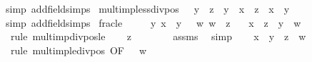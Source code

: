 \begin{isabellebody}
%
\isadelimproof
%
\endisadelimproof
%
\isatagproof
{}\isamarkupfalse%
{\isacharparenleft}{\kern0pt}simp\ add{\isacharcolon}{\kern0pt}field{\isacharunderscore}{\kern0pt}simps{\isacharparenright}{\kern0pt}%
\endisatagproof
{\isafoldproof}%
%
\isadelimproof
\isanewline
%
\endisadelimproof
\isanewline
{}\isamarkupfalse%
\ mult{\isacharunderscore}{\kern0pt}imp{\isacharunderscore}{\kern0pt}less{\isacharunderscore}{\kern0pt}div{\isacharunderscore}{\kern0pt}pos{\isacharcolon}{\kern0pt}\ {\isachardoublequoteopen}{}\ {\isacharless}{\kern0pt}\ y\ {\isasymLongrightarrow}\ z\ {\isacharasterisk}{\kern0pt}\ y\ {\isacharless}{\kern0pt}\ x\ {\isasymLongrightarrow}\ z\ {\isacharless}{\kern0pt}\ x\ {\isacharslash}{\kern0pt}\ y{\isachardoublequoteclose}\isanewline
%
\isadelimproof
%
\endisadelimproof
%
\isatagproof
{}\isamarkupfalse%
{\isacharparenleft}{\kern0pt}simp\ add{\isacharcolon}{\kern0pt}field{\isacharunderscore}{\kern0pt}simps{\isacharparenright}{\kern0pt}%
\endisatagproof
{\isafoldproof}%
%
\isadelimproof
\isanewline
%
\endisadelimproof
\isanewline
{}\isamarkupfalse%
\ frac{\isacharunderscore}{\kern0pt}le{\isacharcolon}{\kern0pt}\isanewline
\ \ \ {\isachardoublequoteopen}{}\ {\isasymle}\ y{\isachardoublequoteclose}\ {\isachardoublequoteopen}x\ {\isasymle}\ y{\isachardoublequoteclose}\ {\isachardoublequoteopen}{}\ {\isacharless}{\kern0pt}\ w{\isachardoublequoteclose}\ {\isachardoublequoteopen}w\ {\isasymle}\ z{\isachardoublequoteclose}\isanewline
\ \ \ {\isachardoublequoteopen}x\ {\isacharslash}{\kern0pt}\ z\ {\isasymle}\ y\ {\isacharslash}{\kern0pt}\ w{\isachardoublequoteclose}\isanewline
%
\isadelimproof
%
\endisadelimproof
%
\isatagproof
{}\isamarkupfalse%
\ {\isacharparenleft}{\kern0pt}rule\ mult{\isacharunderscore}{\kern0pt}imp{\isacharunderscore}{\kern0pt}div{\isacharunderscore}{\kern0pt}pos{\isacharunderscore}{\kern0pt}le{\isacharparenright}{\kern0pt}\isanewline
\ \ \isamarkupfalse%
\ {\isachardoublequoteopen}z\ {\isachargreater}{\kern0pt}\ {}{\isachardoublequoteclose}\isanewline
\ \ \ \ \isamarkupfalse%
\ assms\ \isamarkupfalse%
\ simp\isanewline
\ \ \isamarkupfalse%
\ {\isachardoublequoteopen}x\ {\isasymle}\ y\ {\isacharasterisk}{\kern0pt}\ z\ {\isacharslash}{\kern0pt}\ w{\isachardoublequoteclose}\isanewline
\ \ \isamarkupfalse%
\ {\isacharparenleft}{\kern0pt}rule\ mult{\isacharunderscore}{\kern0pt}imp{\isacharunderscore}{\kern0pt}le{\isacharunderscore}{\kern0pt}div{\isacharunderscore}{\kern0pt}pos\ {\isacharbrackleft}{\kern0pt}OF\ {\isacartoucheopen}{}\ {\isacharless}{\kern0pt}\ w{\isacartoucheclose}{\isacharbrackright}{\kern0pt}{\isacharparenright}{\kern0pt}\isanewline

\end{isabellebody}
